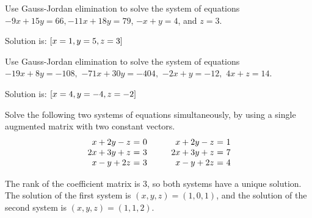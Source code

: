 \begin{enumialphparenastyle}
\begin{ex} Use Gauss-Jordan elimination to solve the system of equations 
$-9x+15y=66,-11x+18y=79$, $-x+y=4$, and $z=3$.
\begin{sol}
Solution is: $\left[x=1,y=5,z=3\right] $
\end{sol}
\end{ex}

\begin{ex} Use Gauss-Jordan elimination to solve the system of equations $-19x+8y=-108,$
$-71x+30y=-404,$ $-2x+y=-12,$ $4x+z=14.$
\begin{sol}
Solution is: $\left[x=4,y=-4,z=-2\right] $
\end{sol}
\end{ex}

\begin{ex}
  Solve the following two systems of equations simultaneously, by
  using a single augmented matrix with two constant vectors.
  \begin{equation*}
    \begin{array}{r@{~}c@{~}l@{~}}
      x  + 2y -  z &=& 0 \\
      2x + 3y +  z &=& 3 \\
      x  -  y + 2z &=& 3 \\
    \end{array}
    \quad\quad
    \begin{array}{r@{~}c@{~}l@{~}}
      x  + 2y -  z &=& 1 \\
      2x + 3y +  z &=& 7 \\
      x  -  y + 2z &=& 4 \\
    \end{array}
  \end{equation*}

  \begin{sol}
    The rank of the coefficient matrix is $3$, so both systems have a
    unique solution. The solution of the first system is
    $(x,y,z)=(1,0,1)$, and the solution of the second system is
    $(x,y,z)=(1,1,2)$.
  \end{sol}
\end{ex}

\end{enumialphparenastyle}
